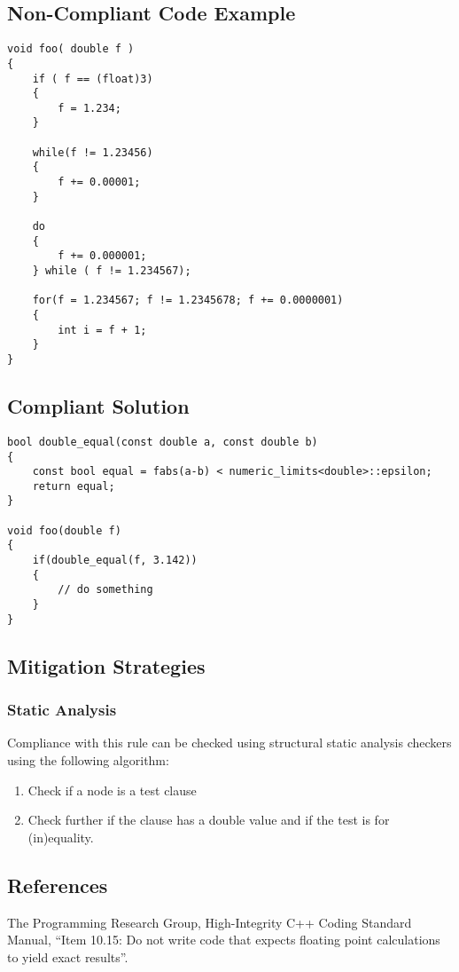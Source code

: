 \subsection{Non-Compliant Code Example}


\begin{verbatim}
void foo( double f )
{
	if ( f == (float)3)
	{
		f = 1.234;
	}

	while(f != 1.23456)
	{
		f += 0.00001;
	}

	do
	{
		f += 0.000001;
	} while ( f != 1.234567);

	for(f = 1.234567; f != 1.2345678; f += 0.0000001)
	{
		int i = f + 1;
	}
}
\end{verbatim}

\subsection{Compliant Solution}


\begin{verbatim}
bool double_equal(const double a, const double b)
{
	const bool equal = fabs(a-b) < numeric_limits<double>::epsilon;
	return equal;
}

void foo(double f)
{
	if(double_equal(f, 3.142))
	{
		// do something
	}
}
\end{verbatim}

\subsection{Mitigation Strategies}
\subsubsection{Static Analysis} 

Compliance with this rule can be checked using structural static analysis checkers using the following algorithm:

\begin{enumerate}
\item Check if a node is a test clause
\item Check further if the clause has a double value and if the test is for (in)equality.
\end{enumerate}

\subsection{References}

The Programming Research Group, High-Integrity C++ Coding Standard Manual, ``Item 10.15: Do not write code that expects floating point calculations to yield exact results''.

